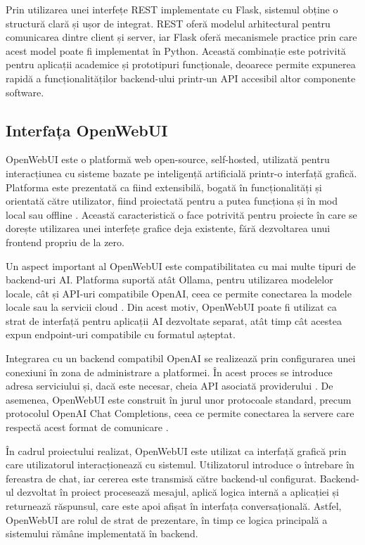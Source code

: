 \documentclass[12pt, a4paper, oneside, romanian]{teza-upb}
\begin{document}
Prin utilizarea unei interfețe REST implementate cu Flask, sistemul obține o structură clară și ușor de integrat. REST oferă modelul arhitectural pentru comunicarea dintre client și server, iar Flask oferă mecanismele practice prin care acest model poate fi implementat în Python. Această combinație este potrivită pentru aplicații academice și prototipuri funcționale, deoarece permite expunerea rapidă a funcționalităților backend-ului printr-un API accesibil altor componente software.

\subsection{Interfața OpenWebUI}

OpenWebUI este o platformă web open-source, self-hosted, utilizată pentru interacțiunea cu sisteme bazate pe inteligență artificială printr-o interfață grafică. Platforma este prezentată ca fiind extensibilă, bogată în funcționalități și orientată către utilizator, fiind proiectată pentru a putea funcționa și în mod local sau offline \cite{openwebui_doc}. Această caracteristică o face potrivită pentru proiecte în care se dorește utilizarea unei interfețe grafice deja existente, fără dezvoltarea unui frontend propriu de la zero.

Un aspect important al OpenWebUI este compatibilitatea cu mai multe tipuri de backend-uri AI. Platforma suportă atât Ollama, pentru utilizarea modelelor locale, cât și API-uri compatibile OpenAI, ceea ce permite conectarea la modele locale sau la servicii cloud \cite{openwebui_doc}. Din acest motiv, OpenWebUI poate fi utilizat ca strat de interfață pentru aplicații AI dezvoltate separat, atât timp cât acestea expun endpoint-uri compatibile cu formatul așteptat.

Integrarea cu un backend compatibil OpenAI se realizează prin configurarea unei conexiuni în zona de administrare a platformei. În acest proces se introduce adresa serviciului și, dacă este necesar, cheia API asociată providerului \cite{openwebui_openai_compatible}. De asemenea, OpenWebUI este construit în jurul unor protocoale standard, precum protocolul OpenAI Chat Completions, ceea ce permite conectarea la servere care respectă acest format de comunicare \cite{openwebui_openai_compatible}.

În cadrul proiectului realizat, OpenWebUI este utilizat ca interfață grafică prin care utilizatorul interacționează cu sistemul. Utilizatorul introduce o întrebare în fereastra de chat, iar cererea este transmisă către backend-ul configurat. Backend-ul dezvoltat în proiect procesează mesajul, aplică logica internă a aplicației și returnează răspunsul, care este apoi afișat în interfața conversațională. Astfel, OpenWebUI are rolul de strat de prezentare, în timp ce logica principală a sistemului rămâne implementată în backend.
\end{document}
